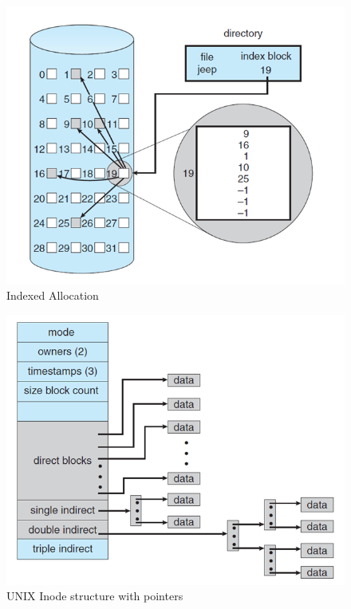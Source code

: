 \documentclass{article}
\theoremstyle{plain}
\theoremstyle{definition}
\begin{document}
\begin{figure}[!h]
    \centering
    \includegraphics[scale=0.5]{os11.png}
    \caption{Indexed Allocation}
    \label{fig:my_label_22}
\end{figure}

\begin{figure}[!h]
    \centering
    \includegraphics[scale=0.5]{os12.png}
    \caption{UNIX Inode structure with pointers}
    \label{fig:my_label_23}
\end{figure}
\end{document}
